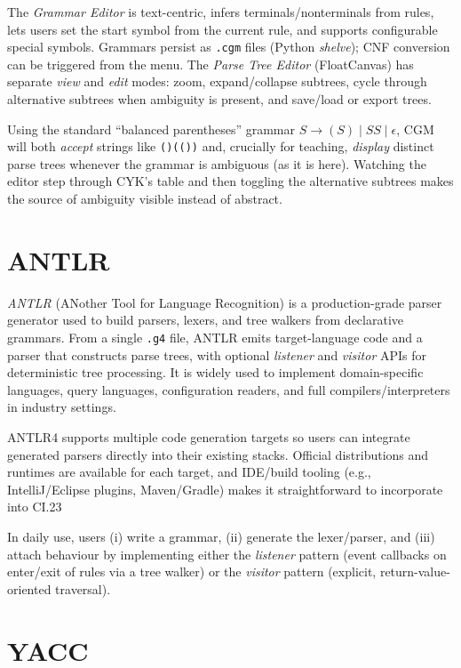 The \emph{Grammar Editor} is text-centric, infers terminals/nonterminals from rules, lets users set the start symbol from the current 
rule, and supports configurable special symbols. 
Grammars persist as \texttt{.cgm} files (Python \emph{shelve}); CNF conversion can be triggered from the menu. 
The \emph{Parse Tree Editor} (FloatCanvas) has separate \emph{view} and \emph{edit} modes: zoom, expand/collapse subtrees, 
cycle through alternative subtrees when ambiguity is present, and save/load or export trees.

Using the standard “balanced parentheses” grammar $S \to (S)\mid SS\mid \epsilon$, CGM will both \emph{accept} strings like 
\texttt{()(())} and, crucially for teaching, \emph{display} distinct parse trees whenever the grammar is ambiguous (as it is here). 
Watching the editor step through CYK's table and then toggling the alternative subtrees makes the source of ambiguity visible 
instead of abstract.

\section{ANTLR}



\textit{ANTLR} (ANother Tool for Language Recognition) is a production-grade parser generator used to build parsers, 
lexers, and tree walkers from declarative grammars. From a single \texttt{.g4} file, ANTLR emits target-language code and a 
parser that constructs parse trees, with optional \emph{listener} and \emph{visitor} APIs for deterministic tree processing. 
It is widely used to implement domain-specific languages, query languages, configuration readers, and full compilers/interpreters 
in industry settings.

ANTLR4 supports multiple code generation targets so users can integrate generated parsers directly into their existing stacks. 
Official distributions and runtimes are available for each target, and IDE/build tooling (e.g., IntelliJ/Eclipse plugins, Maven/Gradle) makes it straightforward to incorporate into CI.23 

In daily use, users (i) write a grammar, (ii) generate the lexer/parser, and (iii) attach behaviour by implementing either the \emph{listener} pattern (event callbacks on enter/exit of rules via a tree walker) or the \emph{visitor} pattern (explicit, return-value-oriented traversal).


\section{YACC} 

